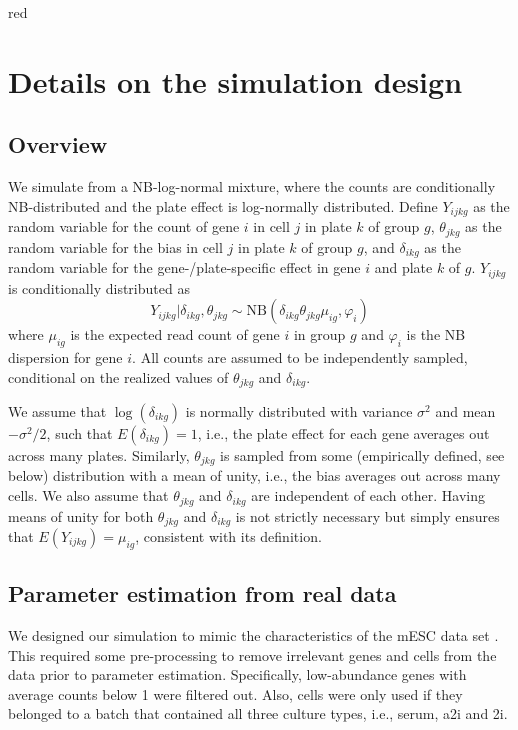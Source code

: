 \documentclass{article}
\begin{document}
\begin{color}{red}
\section{Details on the simulation design}

\subsection{Overview}
We simulate from a NB-log-normal mixture, where the counts are conditionally NB-distributed and the plate effect is log-normally distributed.
Define $Y_{ijkg}$ as the random variable for the count of gene $i$ in cell $j$ in plate $k$ of group $g$, 
    $\theta_{jkg}$ as the random variable for the bias in cell $j$ in plate $k$ of group $g$,
    and $\delta_{ikg}$ as the random variable for the gene-/plate-specific effect in gene $i$ and plate $k$ of $g$.
$Y_{ijkg}$ is conditionally distributed as
\[
    Y_{ijkg} | \delta_{ikg}, \theta_{jkg} \sim \mbox{NB}(\delta_{ikg}\theta_{jkg}\mu_{ig}, \varphi_i)
\]
where $\mu_{ig}$ is the expected read count of gene $i$ in group $g$ and $\varphi_i$ is the NB dispersion for gene $i$.
All counts are assumed to be independently sampled, conditional on the realized values of $\theta_{jkg}$ and $\delta_{ikg}$.

We assume that $\log(\delta_{ikg})$ is normally distributed with variance $\sigma^2$ and mean $-\sigma^2/2$, such that $E(\delta_{ikg}) = 1$, i.e., the plate effect for each gene averages out across many plates.
Similarly, $\theta_{jkg}$ is sampled from some (empirically defined, see below) distribution with a mean of unity, i.e., the bias averages out across many cells.
We also assume that $\theta_{jkg}$ and $\delta_{ikg}$ are independent of each other.
Having means of unity for both $\theta_{jkg}$ and $\delta_{ikg}$ is not strictly necessary but simply ensures that $E(Y_{ijkg})=\mu_{ig}$, consistent with its definition.

\subsection{Parameter estimation from real data}
We designed our simulation to mimic the characteristics of the mESC data set \citep{kolod2015single}.
This required some pre-processing to remove irrelevant genes and cells from the data prior to parameter estimation.
Specifically, low-abundance genes with average counts below 1 were filtered out.
Also, cells were only used if they belonged to a batch that contained all three culture types, i.e., serum, a2i and 2i.


\end{color}
\end{document}
